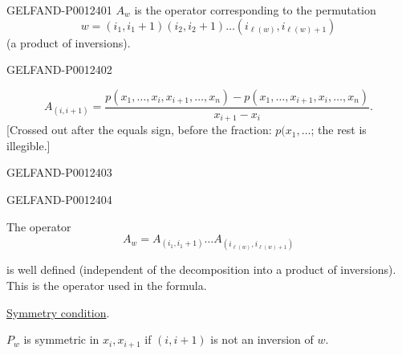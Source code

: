\begin{GelfandAdjacentEvidence}{GELFAND-P001240}{1}
$A_w$ is the operator corresponding to the permutation
\begin{equation*}
w=(i_1,i_1+1)(i_2,i_2+1)\ldots(i_{\ell(w)},i_{\ell(w)+1})
\end{equation*}
(a product of inversions).
\end{GelfandAdjacentEvidence}
\begin{GelfandAdjacentEvidence}{GELFAND-P001240}{2}


\begin{equation*}
A_{(i,i+1)}=
\frac{p(x_1,\ldots,x_i,x_{i+1},\ldots,x_n)-p(x_1,\ldots,x_{i+1},x_i,\ldots,x_n)}{x_{i+1}-x_i}.
\end{equation*}
[Crossed out after the equals sign, before the fraction: $p(x_1,\ldots$; the rest is illegible.]
\end{GelfandAdjacentEvidence}
\begin{GelfandAdjacentEvidence}{GELFAND-P001240}{3}

\end{GelfandAdjacentEvidence}
\begin{GelfandAdjacentEvidence}{GELFAND-P001240}{4}


The operator
\begin{equation*}
A_w=A_{(i_1,i_1+1)}\ldots A_{(i_{\ell(w)},i_{\ell(w)+1})}
\end{equation*}
\end{GelfandAdjacentEvidence}


is well defined (independent of the decomposition into a product of inversions).
This is the operator used in the formula.

\underline{Symmetry condition}.

$P_w$ is symmetric in $x_i,x_{i+1}$ if $(i,i+1)$ is not an inversion of $w$.


